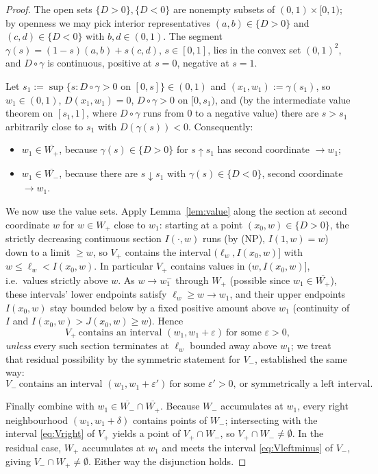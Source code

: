 \documentclass{amsart}
\theoremstyle{plain}
\theoremstyle{definition}
\begin{document}
\begin{proof}
The open sets $\{D>0\},\{D<0\}$ are nonempty subsets of $(0,1)\times[0,1)$; by openness we
may pick interior representatives $(a,b)\in\{D>0\}$ and $(c,d)\in\{D<0\}$ with
$b,d\in(0,1)$.  The segment $\gamma(s)=(1-s)(a,b)+s(c,d)$, $s\in[0,1]$, lies in the convex
set $(0,1)^2$, and $D\circ\gamma$ is continuous, positive at $s=0$, negative at $s=1$.

Let $s_1:=\sup\{s:D\circ\gamma>0\text{ on }[0,s]\}\in(0,1)$ and $(x_1,w_1):=\gamma(s_1)$, so
$w_1\in(0,1)$, $D(x_1,w_1)=0$, $D\circ\gamma>0$ on $[0,s_1)$, and (by the intermediate value
theorem on $[s_1,1]$, where $D\circ\gamma$ runs from $0$ to a negative value) there are
$s>s_1$ arbitrarily close to $s_1$ with $D(\gamma(s))<0$.  Consequently:
\begin{itemize}
\item $w_1\in\overline{W_+}$, because $\gamma(s)\in\{D>0\}$ for $s\uparrow s_1$ has second
coordinate $\to w_1$;
\item $w_1\in\overline{W_-}$, because there are $s\downarrow s_1$ with
$\gamma(s)\in\{D<0\}$, second coordinate $\to w_1$.
\end{itemize}

We now use the value sets.  Apply Lemma~\ref{lem:value} along the section at second
coordinate $w$ for $w\in W_+$ close to $w_1$: starting at a point $(x_0,w)\in\{D>0\}$, the
strictly decreasing continuous section $I(\cdot,w)$ runs (by \textup{(NP)}, $I(1,w)=w$) down
to a limit $\ge w$, so $V_+$ contains the interval $(\ell_w,I(x_0,w)]$ with
$w\le\ell_w<I(x_0,w)$.  In particular $V_+$ contains values in $(w,I(x_0,w)]$, i.e.\ values
strictly above $w$.  As $w\to w_1^-$ through $W_+$ (possible since $w_1\in\overline{W_+}$),
these intervals' lower endpoints satisfy $\ell_w\ge w\to w_1$, and their upper endpoints
$I(x_0,w)$ stay bounded below by a fixed positive amount above $w_1$ (continuity of $I$ and
$I(x_0,w)>J(x_0,w)\ge w$).  Hence
\begin{equation}\label{eq:Vright}
V_+\ \text{contains an interval }(w_1,w_1+\varepsilon)\ \text{for some }\varepsilon>0,
\end{equation}
\emph{unless} every such section terminates at $\ell_w$ bounded away above $w_1$; we treat
that residual possibility by the symmetric statement for $V_-$, established the same way:
\begin{equation}\label{eq:Vleftminus}
V_-\ \text{contains an interval }(w_1,w_1+\varepsilon')\ \text{for some }\varepsilon'>0,
\ \text{or symmetrically a left interval.}
\end{equation}

Finally combine with $w_1\in\overline{W_-}\cap\overline{W_+}$.  Because $W_-$ accumulates at
$w_1$, every right neighbourhood $(w_1,w_1+\delta)$ contains points of $W_-$; intersecting
with the interval \eqref{eq:Vright} of $V_+$ yields a point of $V_+\cap W_-$, so
$V_+\cap W_-\ne\emptyset$.  In the residual case, $W_+$ accumulates at $w_1$ and meets the
interval \eqref{eq:Vleftminus} of $V_-$, giving $V_-\cap W_+\ne\emptyset$.  Either way the
disjunction holds.
\end{proof}
\end{document}

